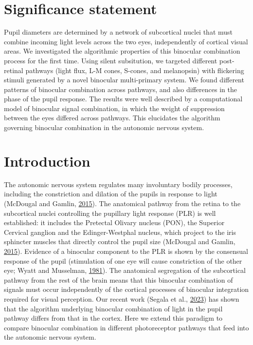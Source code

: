 \documentclass[
]{article}
\begin{document}
\hypertarget{significance-statement}{%
\section{Significance statement}\label{significance-statement}}

Pupil diameters are determined by a network of subcortical nuclei that must combine incoming light levels across the two eyes, independently of cortical visual areas. We investigated the algorithmic properties of this binocular combination process for the first time. Using silent subsitution, we targeted different post-retinal pathways (light flux, L-M cones, S-cones, and melanopsin) with flickering stimuli generated by a novel binocular multi-primary system. We found different patterns of binocular combination across pathways, and also differences in the phase of the pupil response. The results were well described by a computational model of binocular signal combination, in which the weight of suppression between the eyes differed across pathways. This elucidates the algorithm governing binocular combination in the autonomic nervous system.

\hypertarget{introduction}{%
\section{Introduction}\label{introduction}}

The autonomic nervous system regulates many involuntary bodily processes, including the constriction and dilation of the pupils in response to light (McDougal and Gamlin, \protect\hyperlink{ref-McDougal2015}{2015}). The anatomical pathway from the retina to the subcortical nuclei controlling the pupillary light response (PLR) is well established: it includes the Pretectal Olivary nucleus (PON), the Superior Cervical ganglion and the Edinger-Westphal nucleus, which project to the iris sphincter muscles that directly control the pupil size (McDougal and Gamlin, \protect\hyperlink{ref-McDougal2015}{2015}). Evidence of a binocular component to the PLR is shown by the consensual response of the pupil (stimulation of one eye will cause constriction of the other eye; Wyatt and Musselman, \protect\hyperlink{ref-Wyatt1981}{1981}). The anatomical segregation of the subcortical pathway from the rest of the brain means that this binocular combination of signals must occur independently of the cortical processes of binocular integration required for visual perception. Our recent work (Segala et al., \protect\hyperlink{ref-Segala2023}{2023}) has shown that the algorithm underlying binocular combination of light in the pupil pathway differs from that in the cortex. Here we extend this paradigm to compare binocular combination in different photoreceptor pathways that feed into the autonomic nervous system.
\end{document}
